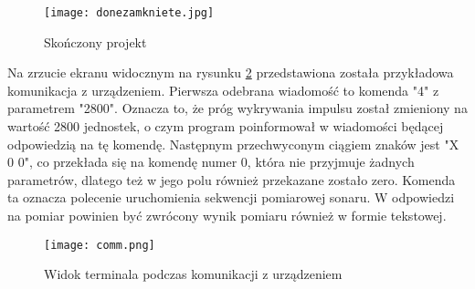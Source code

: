 \begin{figure}[ht!]
    \centering
    \texttt{[image: donezamkniete.jpg]}
    \caption{Skończony projekt}
    \label{fig:done}
\end{figure}
\clearpage
Na zrzucie ekranu widocznym na rysunku \ref{fig:comm} przedstawiona została przykładowa komunikacja z urządzeniem. 
Pierwsza odebrana wiadomość to komenda "4" z parametrem "2800". Oznacza to, 
że próg wykrywania impulsu został zmieniony na wartość 2800 jednostek, o czym program poinformował w wiadomości będącej odpowiedzią na tę komendę.
Następnym przechwyconym ciągiem znaków jest "X 0 0", co przekłada się na komendę numer 0, która nie przyjmuje żadnych parametrów, dlatego też w jego polu również przekazane zostało zero.
Komenda ta oznacza polecenie uruchomienia sekwencji pomiarowej sonaru. W odpowiedzi na pomiar powinien być zwrócony wynik pomiaru również w formie tekstowej.
\begin{figure}[ht!]
    \centering
    \texttt{[image: comm.png]}
    \caption{Widok terminala podczas komunikacji z urządzeniem }
    \label{fig:comm}
\end{figure}
